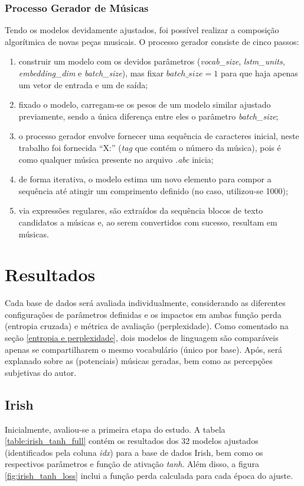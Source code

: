\documentclass[twoside]{automatextcc}
\begin{document}
\subsection{Processo Gerador de Músicas}
Tendo os modelos devidamente ajustados, foi possível realizar a composição algorítmica de novas peças musicais. O processo gerador consiste de cinco passos:
\begin{enumerate}
    \item construir um modelo com os devidos parâmetros (\textit{vocab\_size}, \textit{lstm\_units}, \textit{embedding\_dim} e \textit{batch\_size}), mas fixar $batch\_size=1$ para que haja apenas um vetor de entrada e um de saída; 
    \item fixado o modelo, carregam-se os pesos de um modelo similar ajustado previamente, sendo a única diferença entre eles o parâmetro \textit{batch\_size};
    \item o processo gerador envolve fornecer uma sequência de caracteres inicial, neste trabalho foi fornecida ``X:'' (\textit{tag} que contém o número da música), pois é como qualquer música presente no arquivo \textit{.abc} inicia;
    \item de forma iterativa, o modelo estima um novo elemento para compor a sequência até atingir um comprimento definido (no caso, utilizou-se 1000);
    \item via expressões regulares, são extraídos da sequência blocos de texto candidatos a músicas e, ao serem convertidos com sucesso, resultam em músicas.
\end{enumerate}




\chapter{Resultados}
Cada base de dados será avaliada individualmente, considerando as diferentes configurações de parâmetros definidas e os impactos em ambas função perda (entropia cruzada) e métrica de avaliação (perplexidade). Como comentado na seção \ref{entropia e perplexidade}, dois modelos de linguagem são comparáveis apenas se compartilharem o mesmo vocabulário (único por base). Após, será explanado sobre as (potenciais) músicas geradas, bem como as percepções subjetivas do autor. 



\section{Irish}
Inicialmente, avaliou-se a primeira etapa do estudo. A tabela \ref{table:irish_tanh_full} contém os resultados dos 32 modelos ajustados (identificados pela coluna \textit{idx}) para a base de dados Irish, bem como os respectivos parâmetros e função de ativação \textit{tanh}. Além disso, a figura \ref{fig:irish_tanh_loss} inclui a função perda calculada para cada época do ajuste. 
\end{document}
